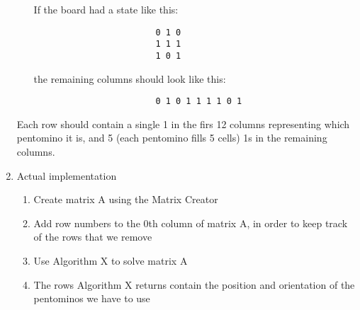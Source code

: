 \documentclass[10pt, a4paper]{article}
\begin{document}
\begin{enumerate}
\begin{itemize}
		            If the board had a state like this:

		            \begin{lstlisting}
						0 1 0
						1 1 1
						1 0 1
					\end{lstlisting}

		            the remaining columns should look like this:

		            \begin{lstlisting}
						0 1 0 1 1 1 1 0 1
					\end{lstlisting}
	      \end{itemize}

	      Each row should contain a single 1 in the firs 12 columns representing which pentomino it is, and 5 (each pentomino fills 5 cells) 1s in the remaining columns.

	\item Actual implementation

	      \begin{enumerate}
		      \item Create matrix A using the Matrix Creator
		      \item Add row numbers to the 0th column of matrix A, in order to keep track of the rows that we remove
		      \item Use Algorithm X to solve matrix A
		      \item The rows Algorithm X returns contain the position and orientation of the pentominos we have to use
	      \end{enumerate}
\end{enumerate}
\end{document}
